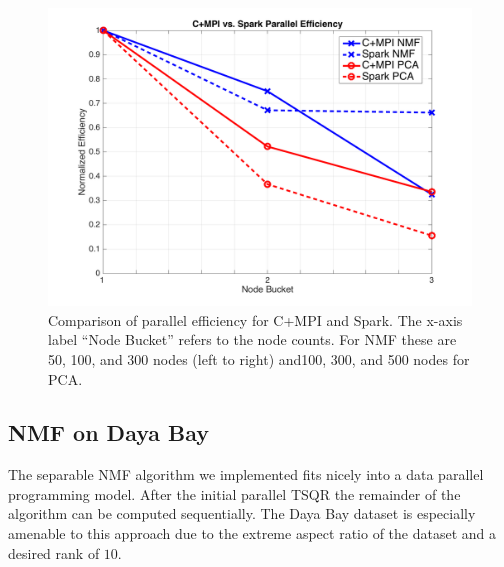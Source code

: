 \begin{figure}[h]
\centering
\includegraphics[width=.5\textwidth]{fig/peff.png}
\caption{Comparison of parallel efficiency for C+MPI and Spark. The x-axis label ``Node Bucket'' refers to the node counts. For NMF these are 50, 100, and 300 nodes (left to right) and100, 300, and 500 nodes for PCA.}
\label{fig:peff}
\end{figure}

\begin{table}[t]
\centering
{}
\caption{{Overall summary of MPI and Spark running time}}
\label{tab:matrix}
\end{table}

\subsection{NMF on Daya Bay}
The separable NMF algorithm we implemented fits nicely into a data parallel programming model. After the initial parallel TSQR the remainder of the algorithm can be computed sequentially. The Daya Bay dataset is especially amenable to this approach due to the extreme aspect ratio of the dataset and a desired rank of $10$.
